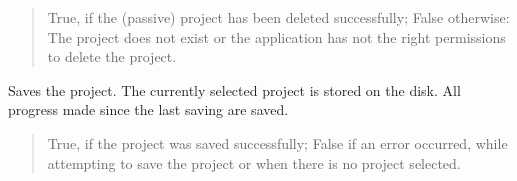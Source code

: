 \documentclass[letterpaper,10pt,english]{sphinxmanual}
\begin{document}
\begin{fulllineitems}
\begin{fulllineitems}
\begin{quote}
\begin{description}
\sphinxAtStartPar
True, if the (passive) project has been deleted successfully; False otherwise: The project does not exist or the application has not the right permissions to delete the project.

\sphinxAtStartPar
{}

\end{description}\end{quote}

\end{fulllineitems}


\begin{fulllineitems}
\label{\detokenize{apidoc/src.osm_configurator.control:src.osm_configurator.control.control_interface.IControl.save_project}}
\pysigstartsignatures
{}
\pysigstopsignatures
\sphinxAtStartPar
Saves the project.
The currently selected project is stored on the disk. All progress made since the last saving are saved.
\begin{quote}\begin{description}
\sphinxAtStartPar
True, if the project was saved successfully; False if an error occurred, while attempting to save the project or when there is no project selected.

\sphinxAtStartPar
{}

\end{description}\end{quote}

\end{fulllineitems}



\end{fulllineitems}
\end{document}
